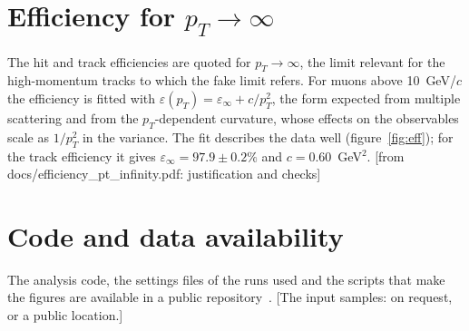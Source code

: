 \IfFileExists{jinst.cls}{\documentclass[a4paper,11pt]{jinst}}
\newcommand{\pT}{p_T}
\newcommand{\todo}[1]{\textcolor{red!70!black}{[#1]}}
\begin{document}
\appendix
\section{Efficiency for $\pT\to\infty$}\label{app:eff}

The hit and track efficiencies are quoted for $\pT\to\infty$, the limit relevant for the
high-momentum tracks to which the fake limit refers. For muons above 10~GeV/$c$ the efficiency is
fitted with $\varepsilon(\pT)=\varepsilon_\infty+c/\pT^2$, the form expected from multiple
scattering and from the $\pT$-dependent curvature, whose effects on the observables scale as
$1/\pT^2$ in the variance. The fit describes the data well (figure~\ref{fig:eff}); for the track
efficiency it gives $\varepsilon_\infty=97.9\pm0.2\%$ and $c=0.60$~GeV$^2$. \todo{from
docs/efficiency\_pt\_infinity.pdf: justification and checks}

\section{Code and data availability}\label{app:code}

The analysis code, the settings files of the runs used and the scripts that make the figures are
available in a public repository~\cite{code}. \todo{The input samples: on request, or a public
location.}


\end{document}
